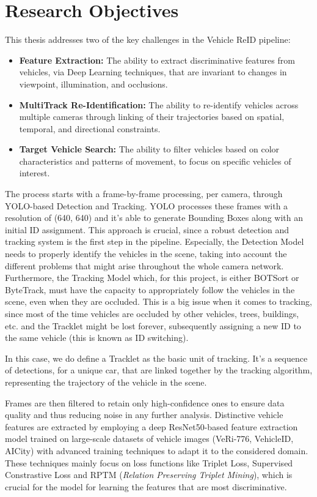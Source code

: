 \section{Research Objectives}
This thesis addresses two of the key challenges in the Vehicle ReID pipeline:
\begin{itemize}
    \item \textbf{Feature Extraction:} The ability to extract discriminative features from vehicles, via Deep Learning techniques, that are invariant to changes in viewpoint, illumination, and occlusions.
    \item \textbf{MultiTrack Re-Identification:} The ability to re-identify vehicles across multiple cameras through linking of their trajectories based on spatial, temporal, and directional constraints.
    \item \textbf{Target Vehicle Search:} The ability to filter vehicles based on color characteristics and patterns of movement, to focus on specific vehicles of interest.
\end{itemize}

The process starts with a frame-by-frame processing, per camera, through YOLO-based Detection and Tracking. YOLO processes these frames with a resolution of (640, 640) and it's able to generate Bounding Boxes along with an initial ID assignment. This approach is crucial, since a robust detection and tracking system is the first step in the pipeline. Especially, the Detection Model needs to properly identify the vehicles in the scene, taking into account the different problems that might arise throughout the whole camera network.
Furthermore, the Tracking Model which, for this project, is either BOTSort or ByteTrack, must have the capacity to appropriately follow the vehicles in the scene, even when they are occluded. This is a big issue when it comes to tracking, since most of the time vehicles are occluded by other vehicles, trees, buildings, etc. and the Tracklet might be lost forever, subsequently assigning a new ID to the same vehicle (this is known as ID switching).

In this case, we do define a Tracklet as the basic unit of tracking. It's a sequence of detections, for a unique car, that are linked together by the tracking algorithm, representing the trajectory of the vehicle in the scene.

Frames are then filtered to retain only high-confidence ones to ensure data quality and thus reducing noise in any further analysis.
Distinctive vehicle features are extracted by employing a deep ResNet50-based feature extraction model trained on large-scale datasets of vehicle images (VeRi-776, VehicleID, AICity) with advanced training techniques to adapt it to the considered domain. These techniques mainly focus on loss functions like Triplet Loss, Supervised Constrastive Loss and RPTM (\textit{Relation Preserving Triplet Mining}), which is crucial for the model for learning the features that are most discriminative.

